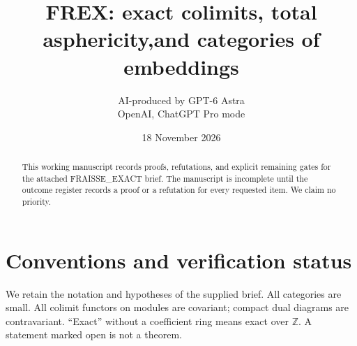 \documentclass[11pt,a4paper]{article}
\title{FREX: exact colimits, total asphericity,\newline and categories of embeddings}
\author{AI-produced by GPT-6 Astra\\OpenAI, ChatGPT Pro mode}
\date{18 November 2026}
\theoremstyle{definition}
\newcommand{\Z}{\mathbb Z}\newcommand{\Q}{\mathbb Q}\newcommand{\R}{\mathbb R}\newcommand{\F}{\mathbb F}\newcommand{\N}{\mathbb N}
\begin{document}
\maketitle
\begin{abstract}
This working manuscript records proofs, refutations, and explicit remaining gates for the attached FRAISSE\_EXACT brief. The manuscript is incomplete until the outcome register records a proof or a refutation for every requested item. We claim no priority.
\end{abstract}
\tableofcontents
\clearpage
\section*{Conventions and verification status}
We retain the notation and hypotheses of the supplied brief. All categories are small. All colimit functors on modules are covariant; compact dual diagrams are contravariant. ``Exact'' without a coefficient ring means exact over $\Z$. A statement marked open is not a theorem.



\end{document}
